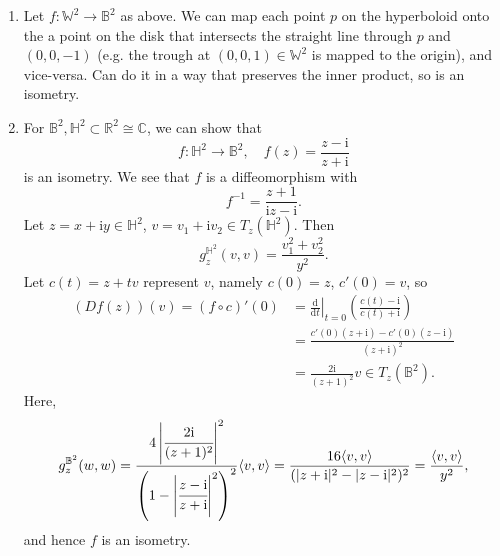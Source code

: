 \documentclass[letter-paper]{tufte-book}
\newenvironment{example}[1][Example]{\begin{trivlist}
\item[\hskip \labelsep {\bfseries #1}]}{\end{trivlist}}
\begin{document}
\begin{example}
  \begin{enumerate}
    \item Let $f: \mathbb{W}^2 \to \mathbb{B}^2$ as above. We can map each point $p$ on the hyperboloid onto the a point on the disk that intersects the straight line through $p$ and $(0,0,-1)$ (e.g. the trough at $(0,0,1) \in \mathbb{W}^2$ is mapped to the origin), and vice-versa. Can do it in a way that preserves the inner product, so is an isometry.
    
    \item For $\mathbb{B}^2, \mathbb{H}^2 \subset \mathbb{R}^2 \cong \mathbb{C}$, we can show that
    \begin{equation*}
      f: \mathbb{H}^2 \to \mathbb{B}^2, \quad f(z) = \frac{z-\mathrm{i}}{z+\mathrm{i}}
    \end{equation*}
    is an isometry. We see that $f$ is a diffeomorphism with
    \begin{equation*}
      f^{-1} = \frac{z+1}{\mathrm{i}z - \mathrm{i}}.
    \end{equation*}
    Let $z=x+\mathrm{i}y \in \mathbb{H}^2$, $v = v_1 + \mathrm{i}v_2 \in T_z(\mathbb{H}^2)$. Then
    \begin{equation*}
      g_z^{\mathbb{H}^2}(v, v) = \frac{v_1^2 + v_2^2}{y^2}.
    \end{equation*}
    Let $c(t) = z + tv$ represent $v$, namely $c(0) = z$, $c'(0) = v$, so
    \begin{align*}
      (Df(z))(v) = (f\circ c)'(0)
        &= \left.\frac{\mathrm{d}}{\mathrm{d}t}\right|_{t=0} \left(\frac{c(t) - \mathrm{i}}{c(t) + \mathrm{i}}\right)\\
        &= \frac{c'(0)(z+\mathrm{i}) - c'(0)(z-\mathrm{i})}{(z+\mathrm{i})^2}\\
        &= \frac{2\mathrm{i}}{(z+1)^2}v \in T_z(\mathbb{B}^2).
    \end{align*}
    Here,
    \begin{equation*}
      g_z^{\mathbb{B}^2}(w, w)
        = \frac{4\left|\cfrac{2\mathrm{i}}{(z+1)^2}\right|^2}{\left(1-\left|\cfrac{z-\mathrm{i}}{z+\mathrm{i}}\right|^2\right)^2}\langle v,v\rangle 
        = \frac{16\langle v,v\rangle}{(|z+\mathrm{i}|^2 - |z-\mathrm{i}|^2)^2} = \frac{\langle v,v\rangle}{y^2},
    \end{equation*}
    and hence $f$ is an isometry.
  \end{enumerate}
\end{example}
\end{document}
